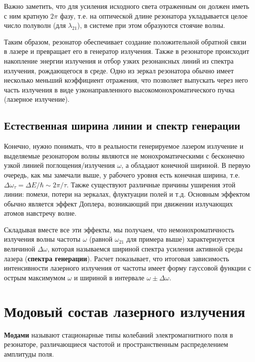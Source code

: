 \documentclass[12pt]{kiarticle}
\begin{document}
Важно заметить, что для усиления исходного света отраженным он должен иметь с ним кратную $ 2\pi $ фазу, т.е. на оптической длине резонатора укладывается целое число полуволн (для $ \lambda_{21} $), в системе при этом образуются стоячие волны. 

Таким образом, резонатор обеспечивает
создание положительной обратной связи в лазере и превращает его
в генератор излучения. Также в резонаторе происходит накопление
энергии излучения и отбор узких резонансных линий из спектра
излучения, рождающегося в среде. Одно из зеркал резонатора обычно
имеет несколько меньший коэффициент отражения, что позволяет
выпускать через него часть излучения в виде узконаправленного
высокомонохроматического пучка (лазерное излучение).

\subsection{Естественная ширина линии и спектр генерации}

Конечно, нужно понимать, что в реальности генерируемое лазером излучение и выделяемые резонатором волны являются не монохроматическими с бесконечно узкой линией поглощения/излучения $ \omega $, а обладают конечной шириной. В первую очередь, как мы замечали выше, у рабочего уровня есть конечная ширина, т.е. $ \Delta \omega_\tau = \Delta E / \hbar \sim 2 \pi / \tau $. Также существуют различные причины уширения этой линии: помехи, потери на зеркалах, флуктуации полей и т.д. Основным эффектом обычно является эффект Доплера, возникающий при движении излучающих атомов навстречу волне. 

Складывая вместе все эти эффекты, мы получаем, что немонохроматичность излучения волны частоты $ \omega $ (равной $ \omega_{21} $ для примера выше) характеризуется величиной $ \Delta \omega $, которая называемся шириной спектра усиления активной среды лазера (\textbf{спектра генерации}). Расчет показывает, что итоговая зависимость интенсивности лазерного излучения от частоты имеет форму гауссовой функции с острым максимумом $ \omega $ и шириной в интервале $ \omega \pm \Delta \omega $. 

\section{Модовый состав лазерного излучения}

\textbf{Модами} называют стационарные типы колебаний электромагнитного поля в резонаторе, различающиеся частотой и пространственным распределением амплитуды поля.
\end{document}
